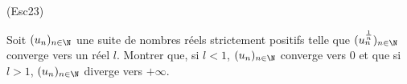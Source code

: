 \begin{tiny}(Esc23)\end{tiny} Soit $(u_{n})_{n\in \N}$ une suite de nombres r{\'e}els
strictement positifs telle que $(u_{n}^{\frac{1}{n}})_{n\in \N}$ converge vers un r{\'e}el $l$. Montrer que, si $l<1$, $(u_{n})_{n\in \N}$ converge vers 0 et que si $l>1$, $(u_{n})_{n\in \N}$
diverge vers $+\infty $.